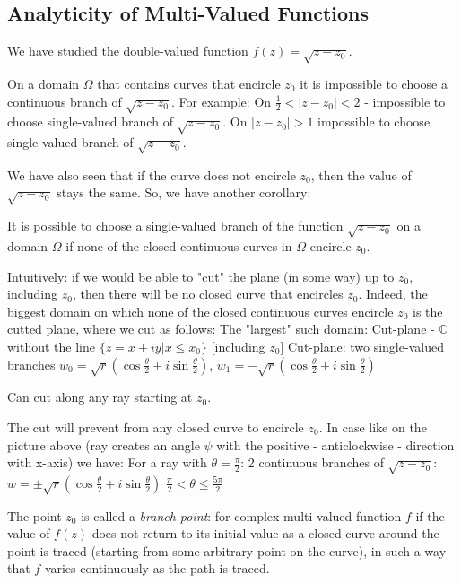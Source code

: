 \documentclass[12pt]{article}
\begin{document}
\subsection{Analyticity of Multi-Valued Functions}
We have studied the double-valued function $f(z) = \sqrt{z-z_0}$.
\begin{remark}
On a domain $\Omega$ that contains curves that encircle $z_0$ it is impossible to choose a continuous branch of $\sqrt{z-z_0}$.
For example: On $\frac{1}{2} < |z-z_0| < 2$ - impossible to choose single-valued branch of $\sqrt{z-z_0}$.
On $|z-z_0| > 1$ impossible to choose single-valued branch of $\sqrt{z-z_0}$.
\end{remark}
We have also seen that if the curve does not encircle $z_0$, then the value of $\sqrt{z-z_0}$ stays the same. So, we have another corollary:
\begin{corollary}
It is possible to choose a single-valued branch of the function $\sqrt{z-z_0}$ on a domain $\Omega$ if none of the closed continuous curves in $\Omega$ encircle $z_0$.
\end{corollary}
Intuitively: if we would be able to "cut" the plane (in some way) up to $z_0$, including $z_0$, then there will be no closed curve that encircles $z_0$. Indeed, the biggest domain on which none of the closed continuous curves encircle $z_0$ is the cutted plane, where we cut as follows:
The "largest" such domain: Cut-plane - $\mathbb{C}$ without the line $\{z = x+iy| x\leq x_0\}$ [including $z_0$]
Cut-plane: two single-valued branches $w_0 = \sqrt{r}(\cos\frac{\theta}{2} + i\sin\frac{\theta}{2})$, $w_1 = -\sqrt{r}(\cos\frac{\theta}{2} + i\sin\frac{\theta}{2})$

\begin{remark}
Can cut along any ray starting at $z_0$.
\end{remark}
The cut will prevent from any closed curve to encircle $z_0$. In case like on the picture above (ray creates an angle $\psi$ with the positive - anticlockwise - direction with x-axis) we have:
For a ray with $\theta = \frac{\pi}{2}$: 2 continuous branches of $\sqrt{z-z_0}$:
$w = \pm \sqrt{r}(\cos\frac{\theta}{2} + i\sin\frac{\theta}{2})$ $\frac{\pi}{2} < \theta \leq \frac{5\pi}{2}$

\begin{definition}
The point $z_0$ is called a \emph{branch point}: for complex multi-valued function $f$ if the value of $f(z)$ does not return to its initial value as a closed curve around the point is traced (starting from some arbitrary point on the curve), in such a way that $f$ varies continuously as the path is traced.
\end{definition}
\end{document}
